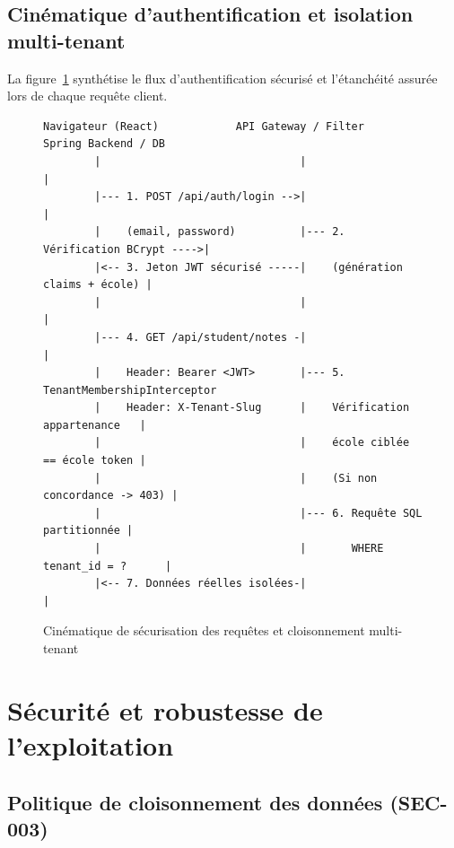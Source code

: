 \subsection{Cinématique d'authentification et isolation multi-tenant}

La figure~\ref{fig:auth-seq} synthétise le flux d'authentification sécurisé et l'étanchéité assurée lors de chaque requête client.

\begin{figure}[h]
\centering
\small
\begin{verbatim}
Navigateur (React)            API Gateway / Filter             Spring Backend / DB
        |                               |                                |
        |--- 1. POST /api/auth/login -->|                                |
        |    (email, password)          |--- 2. Vérification BCrypt ---->|
        |<-- 3. Jeton JWT sécurisé -----|    (génération claims + école) |
        |                               |                                |
        |--- 4. GET /api/student/notes -|                                |
        |    Header: Bearer <JWT>       |--- 5. TenantMembershipInterceptor
        |    Header: X-Tenant-Slug      |    Vérification appartenance   |
        |                               |    école ciblée == école token |
        |                               |    (Si non concordance -> 403) |
        |                               |--- 6. Requête SQL partitionnée |
        |                               |       WHERE tenant_id = ?      |
        |<-- 7. Données réelles isolées-|                                |
\end{verbatim}
\caption{Cinématique de sécurisation des requêtes et cloisonnement multi-tenant}
\label{fig:auth-seq}
\end{figure}

\section{Sécurité et robustesse de l'exploitation}

\subsection{Politique de cloisonnement des données (SEC-003)}

